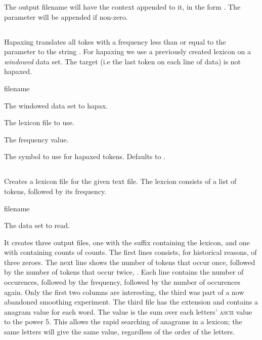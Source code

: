 \documentclass[a4paper,10pt,twoside]{report}
\begin{document}
The output filename will have the context appended to it, in the form
. The  parameter will be appended if non-zero.

\subsection{}

Hapaxing translates all tokes with a frequency less than or equal to
the  parameter to the string . For hapaxing we use
a previously created lexicon on a \emph{windowed} data set. The target
(i.e the last token on each line of data) is not hapaxed.

\begin{varlist}{filename}
\item[filename] The windowed data set to hapax.
\item[lexicon] The lexicon file to use.
\item[hpx] The frequency value.
\item[hpx\_sym] The symbol to use for hapaxed tokens. Defaults to
  . 
\end{varlist}

\subsection{}

Creates a lexicon file for the given text file. The lexcion consists
of a list of tokens, followed by its frequency.

\begin{varlist}{filename}
\item[filename] The data set to read.
\end{varlist}

It creates three output files, one with the suffix 
containing the lexicon, and one with  containing counts of
counts. The first lines consists, for historical reasons, of three 
zeroes. The next line shows the number of tokens that occur once,
followed by the number of tokens that occur twice, \etc{}. Each line
contains the number of occurences, followed by the frequency, followed
by the number of occurences again. Only the first two columns are
interesting, the third was part of a now abandoned smoothing experiment.
The third file has the extension  and contains a
anagram value for each word. The value is the sum over each letters'
\textsc{ascii} value to the power 5. This allows the rapid searching
of anagrams in a lexicon; the same letters will give the same value,
regardless of the order of the letters.
\end{document}
